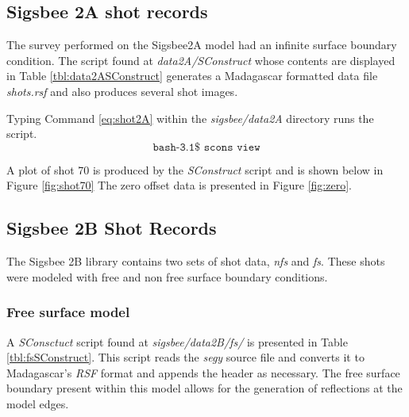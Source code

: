\subsection{Sigsbee 2A shot records}
The survey performed on the Sigsbee2A model had an infinite surface boundary condition.  The script found at 
\emph{data2A/SConstruct} whose contents are displayed in Table \ref{tbl:data2ASConstruct} generates a Madagascar 
formatted data file \emph{shots.rsf} and also produces several shot images. 
  
{
\tiny

\normalsize
}

Typing Command \ref{eq:shot2A} within the \emph{sigsbee/data2A} directory runs the script.
\begin{equation}\label{eq:shot2A} \texttt{bash-3.1\$\ scons\ view} \end{equation}

A plot of shot 70  is produced by the \emph{SConstruct} script and is shown below in Figure \ref{fig:shot70}  The zero offset 
data is presented in Figure \ref{fig:zero}.


\subsection{Sigsbee 2B Shot Records}
The Sigsbee 2B library contains two sets of shot data, \emph{nfs} and \emph{fs}.  These shots were modeled with free and non free surface 
boundary conditions.  

\subsubsection{Free surface model}  
A \emph{SConsctuct} script found at \textit{sigsbee/data2B/fs/} is presented in Table \ref{tbl:fsSConstruct}.  
This script reads the \emph{segy} source file and converts it to Madagascar's \emph{RSF} format and appends the header as 
necessary.  The free surface boundary present within this model allows for the generation of reflections at the model edges.  

{
\tiny

\normalsize
}


